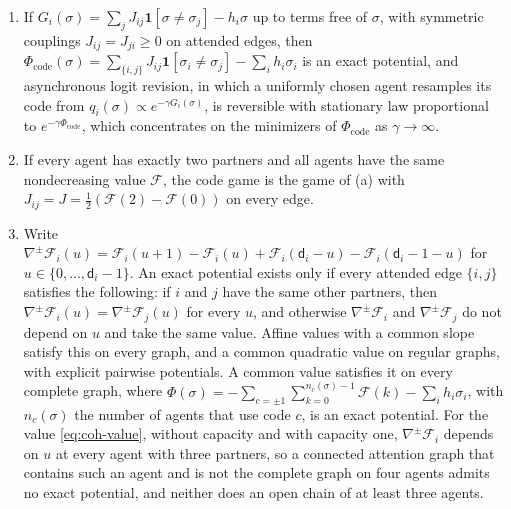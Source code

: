 \begin{proposition}\label{prop:coh-code-potential}
\begin{enumerate}\renewcommand{\labelenumi}{(\alph{enumi})}
\item If $G_i(\sigma)=\sum_jJ_{ij}\mathbf 1[\sigma\ne\sigma_j]-h_i\sigma$ up to terms free of $\sigma$, with symmetric couplings $J_{ij}=J_{ji}\ge0$ on attended edges, then $\Phi_{\mathrm{code}}(\sigma)=\sum_{\{i,j\}}J_{ij}\mathbf 1[\sigma_i\ne\sigma_j]-\sum_ih_i\sigma_i$ is an exact potential, and asynchronous logit revision, in which a uniformly chosen agent resamples its code from $q_i(\sigma)\propto e^{-\gamma G_i(\sigma)}$, is reversible with stationary law proportional to $e^{-\gamma\Phi_{\mathrm{code}}}$, which concentrates on the minimizers of $\Phi_{\mathrm{code}}$ as $\gamma\to\infty$.
\item If every agent has exactly two partners and all agents have the same nondecreasing value $\mathcal F$, the code game is the game of (a) with $J_{ij}=J=\frac12(\mathcal F(2)-\mathcal F(0))$ on every edge.
\item Write $\nabla^{\pm}\mathcal F_i(u)=\mathcal F_i(u+1)-\mathcal F_i(u)+\mathcal F_i(\mathsf d_i-u)-\mathcal F_i(\mathsf d_i-1-u)$ for $u\in\{0,\dots,\mathsf d_i-1\}$. An exact potential exists only if every attended edge $\{i,j\}$ satisfies the following: if $i$ and $j$ have the same other partners, then $\nabla^{\pm}\mathcal F_i(u)=\nabla^{\pm}\mathcal F_j(u)$ for every $u$, and otherwise $\nabla^{\pm}\mathcal F_i$ and $\nabla^{\pm}\mathcal F_j$ do not depend on $u$ and take the same value. Affine values with a common slope satisfy this on every graph, and a common quadratic value on regular graphs, with explicit pairwise potentials. A common value satisfies it on every complete graph, where $\Phi(\sigma)=-\sum_{c=\pm1}\sum_{k=0}^{n_c(\sigma)-1}\mathcal F(k)-\sum_ih_i\sigma_i$, with $n_c(\sigma)$ the number of agents that use code $c$, is an exact potential. For the value \eqref{eq:coh-value}, without capacity and with capacity one, $\nabla^{\pm}\mathcal F_i$ depends on $u$ at every agent with three partners, so a connected attention graph that contains such an agent and is not the complete graph on four agents admits no exact potential, and neither does an open chain of at least three agents.
\end{enumerate}
\end{proposition}


